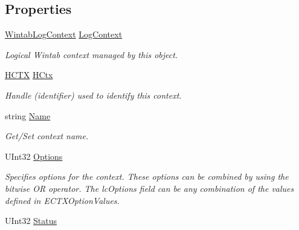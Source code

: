 \subsection*{Properties}
\begin{DoxyCompactItemize}
\item 
\hyperlink{struct_wintab_d_n_1_1_wintab_log_context}{WintabLogContext} \hyperlink{class_wintab_d_n_1_1_c_wintab_context_a7d64da6a0f08eeb371ef4dac5e9f0077}{LogContext}
\begin{DoxyCompactList}\small\item\em Logical Wintab context managed by this object. \item\end{DoxyCompactList}\item 
\hyperlink{class_wintab_d_n_1_1_h_c_t_x}{HCTX} \hyperlink{class_wintab_d_n_1_1_c_wintab_context_a94553614e6d802faa0133eee5fba4139}{HCtx}
\begin{DoxyCompactList}\small\item\em Handle (identifier) used to identify this context. \item\end{DoxyCompactList}\item 
string \hyperlink{class_wintab_d_n_1_1_c_wintab_context_a7a6350862c15ab27db4d465d3d70d71a}{Name}
\begin{DoxyCompactList}\small\item\em Get/Set context name. \item\end{DoxyCompactList}\item 
UInt32 \hyperlink{class_wintab_d_n_1_1_c_wintab_context_abe5e141b4c07ad5a52ed4fb47479af7a}{Options}
\begin{DoxyCompactList}\small\item\em Specifies options for the context. These options can be combined by using the bitwise OR operator. The lcOptions field can be any combination of the values defined in ECTXOptionValues. \item\end{DoxyCompactList}\item 
UInt32 \hyperlink{class_wintab_d_n_1_1_c_wintab_context_a438ab3e5e62042fd6aa2f57cee4509c6}{Status}

\end{DoxyCompactItemize}
